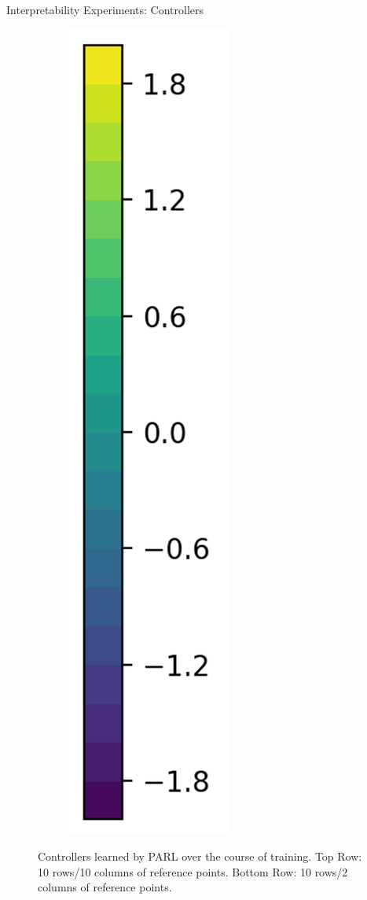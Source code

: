 \documentclass{beamer}
\begin{document}
\begin{frame}{Interpretability Experiments: Controllers}
\begin{figure}[t]
\begin{subfigure}{0.05\linewidth}
      \includegraphics[width=\linewidth,trim=0 0 0 0,clip]{assets/ref_plots/controller_colorbar}
    \end{subfigure}
    \caption{Controllers learned by PARL over the course of training. Top Row: 10 rows/10 columns of reference points. Bottom Row: 10 rows/2 columns of reference points.}
  \end{figure}
\end{frame}
\end{document}
